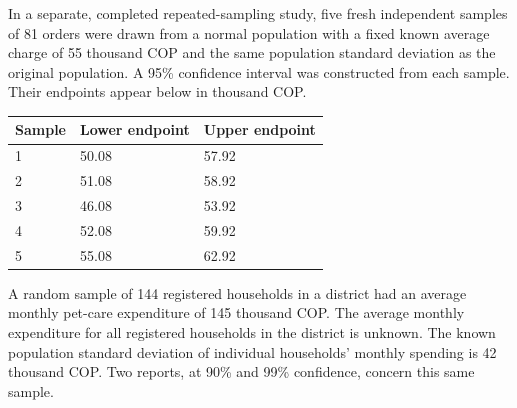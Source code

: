 In a separate, completed repeated-sampling study, five fresh independent samples of 81 orders were drawn from a normal population with a fixed known average charge of 55 thousand COP and the same population standard deviation as the original population. A 95\% confidence interval was constructed from each sample. Their endpoints appear below in thousand COP.

\begin{center}\begin{tabular}{@{}lll@{}}\toprule
Sample & Lower endpoint & Upper endpoint\\\midrule
1 & 50.08 & 57.92\\
2 & 51.08 & 58.92\\
3 & 46.08 & 53.92\\
4 & 52.08 & 59.92\\
5 & 55.08 & 62.92\\
\bottomrule\end{tabular}\end{center}


\BlankInformationTable

\clearpage
{}


\vfill


\clearpage
{}
A random sample of 144 registered households in a district had an average monthly pet-care expenditure of 145 thousand COP. The average monthly expenditure for all registered households in the district is unknown. The known population standard deviation of individual households' monthly spending is 42 thousand COP. Two reports, at 90\% and 99\% confidence, concern this same sample.

